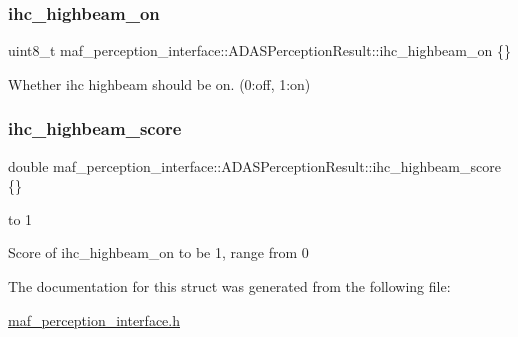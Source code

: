 \subsubsection{\texorpdfstring{ihc\+\_\+highbeam\+\_\+on}{ihc\_highbeam\_on}}
{\footnotesize\ttfamily uint8\+\_\+t maf\+\_\+perception\+\_\+interface\+::\+A\+D\+A\+S\+Perception\+Result\+::ihc\+\_\+highbeam\+\_\+on \{\}}



Whether ihc highbeam should be on. (0\+:off, 1\+:on) 

\mbox{\label{structmaf__perception__interface_1_1ADASPerceptionResult_a9a7c255ad020646a1855d4fca1ddf78c}} 
\subsubsection{\texorpdfstring{ihc\+\_\+highbeam\+\_\+score}{ihc\_highbeam\_score}}
{\footnotesize\ttfamily double maf\+\_\+perception\+\_\+interface\+::\+A\+D\+A\+S\+Perception\+Result\+::ihc\+\_\+highbeam\+\_\+score \{\}}



to 1 

Score of ihc\+\_\+highbeam\+\_\+on to be 1, range from 0 

The documentation for this struct was generated from the following file\+:\begin{DoxyCompactItemize}
\item 
\hyperlink{maf__perception__interface_8h}{maf\+\_\+perception\+\_\+interface.\+h}\end{DoxyCompactItemize}
